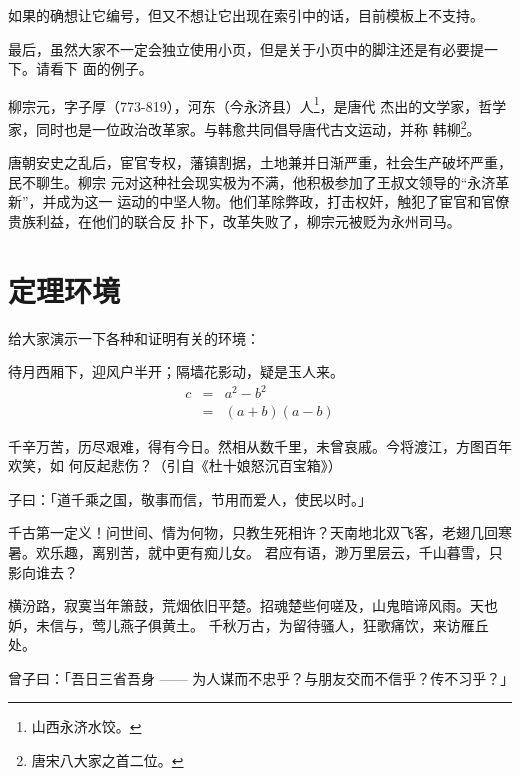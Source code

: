如果的确想让它编号，但又不想让它出现在索引中的话，目前模板上不支持。

最后，虽然大家不一定会独立使用小页，但是关于小页中的脚注还是有必要提一下。请看下
面的例子。

\begin{minipage}[t]{\linewidth-2\parindent}
  柳宗元，字子厚（773-819），河东（今永济县）人\footnote{山西永济水饺。}，是唐代
  杰出的文学家，哲学家，同时也是一位政治改革家。与韩愈共同倡导唐代古文运动，并称
  韩柳\footnote{唐宋八大家之首二位。}。
\end{minipage}

唐朝安史之乱后，宦官专权，藩镇割据，土地兼并日渐严重，社会生产破坏严重，民不聊生。柳宗
元对这种社会现实极为不满，他积极参加了王叔文领导的“永济革新”，并成为这一
运动的中坚人物。他们革除弊政，打击权奸，触犯了宦官和官僚贵族利益，在他们的联合反
扑下，改革失败了，柳宗元被贬为永州司马。

\section{定理环境}
\label{sec:theorem}

给大家演示一下各种和证明有关的环境：

\begin{assumption}
待月西厢下，迎风户半开；隔墙花影动，疑是玉人来。
\begin{eqnarray}
  \label{eq:eqnxmp}
  c & = & a^2 - b^2\\
    & = & (a+b)(a-b)
\end{eqnarray}
\end{assumption}

千辛万苦，历尽艰难，得有今日。然相从数千里，未曾哀戚。今将渡江，方图百年欢笑，如
何反起悲伤？（引自《杜十娘怒沉百宝箱》）

\begin{definition}
子曰：「道千乘之国，敬事而信，节用而爱人，使民以时。」
\end{definition}

千古第一定义！问世间、情为何物，只教生死相许？天南地北双飞客，老翅几回寒暑。欢乐趣，离别苦，就中更有痴儿女。
君应有语，渺万里层云，千山暮雪，只影向谁去？

横汾路，寂寞当年箫鼓，荒烟依旧平楚。招魂楚些何嗟及，山鬼暗谛风雨。天也妒，未信与，莺儿燕子俱黄土。
千秋万古，为留待骚人，狂歌痛饮，来访雁丘处。

\begin{proposition}
 曾子曰：「吾日三省吾身 —— 为人谋而不忠乎？与朋友交而不信乎？传不习乎？」
\end{proposition}

